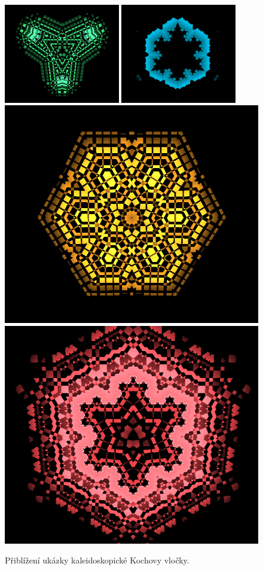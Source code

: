 \documentclass[thesis=B, czech]{FITthesis}[2019/03/06]
\begin{document}
\begin{figure}
    \centering
    \noindent
    \includegraphics[width=0.45\textwidth]{images/previous_versions/kaleidoscope0.png}\hspace{0.05\textwidth}%
    \includegraphics[width=0.45\textwidth]{images/previous_versions/kaleidoscope1.png}\\[1em]
    \includegraphics[width=0.45\linewidth]{images/previous_versions/kaleidoscope2.png}\hspace{0.05\textwidth}%
    \includegraphics[width=0.45\linewidth]{images/previous_versions/kaleidoscope3.png}\par
    \caption{Přiblížení ukázky kaleidoskopické Kochovy vločky.}
    \label{fig:kalei}
\end{figure}
\end{document}
